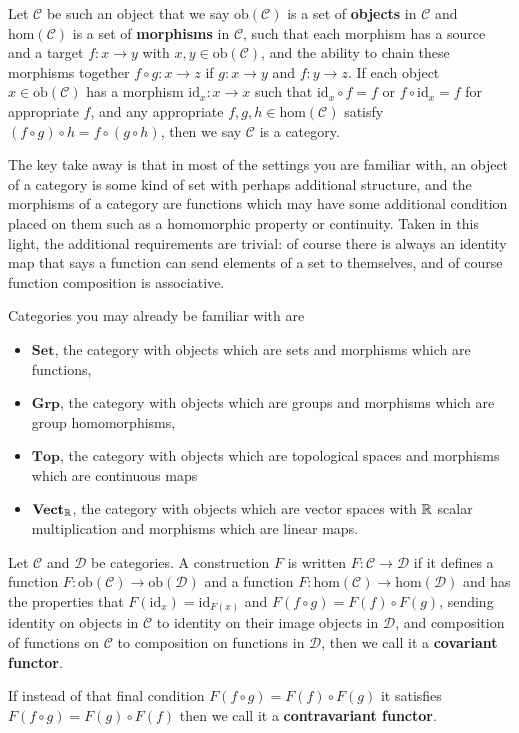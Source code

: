 \documentclass[11pt]{article}
\begin{document}
\begin{definition}[Category]
Let $\mathcal{C}$ be such an object that we say $\mathrm{ob}(\mathcal{C})$ is a set of \textbf{objects} in $\mathcal{C}$ and $\mathrm{hom}(\mathcal{C})$ is a set of \textbf{morphisms} in $\mathcal{C}$, such that each morphism has a source and a target $f \colon x \to y$ with $x,y \in \mathrm{ob}(\mathcal{C})$, and the ability to chain these morphisms together $f\circ g \colon x \to z$ if $g \colon x \to y$ and $f \colon y \to z$. If each object $x \in \mathrm{ob}(\mathcal{C})$ has a morphism $\mathrm{id}_x \colon x \to x$ such that $\mathrm{id}_x \circ f = f$ or $f \circ \mathrm{id}_x = f$ for appropriate $f$, and any appropriate $f,g,h \in \mathrm{hom}(\mathcal{C})$ satisfy $(f \circ g) \circ h = f \circ (g \circ h)$, then we say $\mathcal{C}$ is a category.
\end{definition}

The key take away is that in most of the settings you are familiar with, an object of a category is some kind of set with perhaps additional structure, and the morphisms of a category are functions which may have some additional condition placed on them such as a homomorphic property or continuity. Taken in this light, the additional requirements are trivial: of course there is always an identity map that says a function can send elements of a set to themselves, and of course function composition is associative.

Categories you may already be familiar with are \begin{itemize}
\item $\mathbf{Set}$, the category with objects which are sets and morphisms which are functions,
\item $\mathbf{Grp}$, the category with objects which are groups and morphisms which are group homomorphisms,
\item $\mathbf{Top}$, the category with objects which are topological spaces and morphisms which are continuous maps
\item $\mathbf{Vect}_{\mathbb{R}}$, the category with objects which are vector spaces with $\mathbb{R}$ scalar multiplication and morphisms which are linear maps.
\end{itemize}

\begin{definition}[Functor]
Let $\mathcal{C}$ and $\mathcal{D}$ be categories. A construction $F$ is written $F \colon \mathcal{C} \to \mathcal{D}$ if it defines a function $F \colon \mathrm{ob}(\mathcal{C}) \to \mathrm{ob}(\mathcal{D})$ and a function $F \colon \mathrm{hom}(\mathcal{C}) \to \mathrm{hom}(\mathcal{D})$ and has the properties that $F(\mathrm{id}_x) = \mathrm{id}_{F(x)}$ and $F(f \circ g) = F(f) \circ F(g)$, sending identity on objects in $\mathcal{C}$ to identity on their image objects in $\mathcal{D}$, and composition of functions on $\mathcal{C}$ to composition on functions in $\mathcal{D}$, then we call it a \textbf{covariant functor}.

If instead of that final condition $F(f \circ g) = F(f) \circ F(g)$ it satisfies $F(f \circ g) = F(g) \circ F(f)$ then we call it a \textbf{contravariant functor}.
\end{definition}
\end{document}
